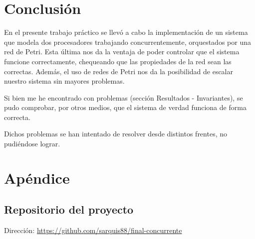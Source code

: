 \documentclass{article}
\begin{document}
    \section{Conclusión}
    En el presente trabajo práctico se llevó a cabo la implementación de un sistema que modela
    dos procesadores trabajando concurrentemente, orquestados por una red de Petri. Esta última
    nos da la ventaja de poder controlar que el sistema funcione correctamente, chequeando que
    las propiedades de la red sean las correctas. Además, el uso de redes de Petri nos da la 
    posibilidad de escalar nuestro sistema sin mayores problemas. \par
    Si bien me he encontrado con problemas (sección Resultados - Invariantes), se pudo 
    comprobar, por otros medios, que el sistema de verdad funciona de forma correcta. \par
    Dichos problemas se han intentado de resolver desde distintos frentes, no pudiéndose 
    lograr.
    \newpage 
    \section{Apéndice}
    \subsection{Repositorio del proyecto} \noindent
    Dirección: \url{https://github.com/sarquis88/final-concurrente}
\end{document}
